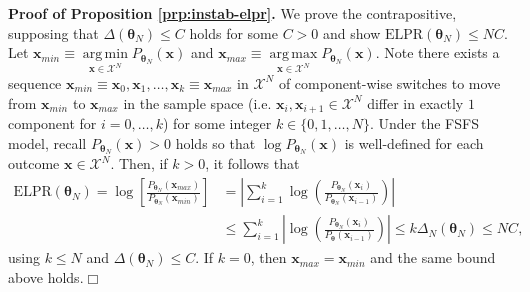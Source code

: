 \documentclass[12pt]{article}
\theoremstyle{definition}
\DeclareMathOperator*{\argmin}{arg\,min}
\DeclareMathOperator*{\argmax}{arg\,max}
\begin{document}
\textbf{Proof of Proposition \ref{prp:instab-elpr}.} We prove the
contrapositive, supposing that \(\Delta(\boldsymbol \theta_N) \le C\)
holds for some \(C > 0\) and show
\(\text{ELPR}(\boldsymbol \theta_N) \leq NC\). Let
\(\boldsymbol x_{min} \equiv \argmin\limits_{\boldsymbol x \in \mathcal{X}^N}P_{\boldsymbol \theta_N}(\boldsymbol x)\)
and
\(\boldsymbol x_{max} \equiv \argmax\limits_{\boldsymbol x \in \mathcal{X}^N}P_{\boldsymbol \theta_N}(\boldsymbol x)\).
Note there exists a sequence
\(\boldsymbol x_{min} \equiv \boldsymbol x_0, \boldsymbol x_1, \dots, \boldsymbol x_k \equiv \boldsymbol x_{max}\)
in \(\mathcal{X}^N\) of component-wise switches to move from
\(\boldsymbol x_{min}\) to \(\boldsymbol x_{max}\) in the sample space
(i.e. \(\boldsymbol x_i, \boldsymbol x_{i + 1} \in \mathcal{X}^N\)
differ in exactly \(1\) component for \(i = 0, \dots, k\)) for some
integer \(k \in \{0, 1, \dots, N\}\). Under the FSFS model, recall
\(P_{\boldsymbol \theta_N}(\boldsymbol x) > 0\) holds so that
\(\log P_{\boldsymbol \theta_N}(\boldsymbol x)\) is well-defined for
each outcome \(\boldsymbol x \in \mathcal{X}^N\). Then, if \(k > 0\), it
follows that
\begin{align*}
\text{ELPR}(\boldsymbol \theta_N) = \log\left[\frac{P_{\boldsymbol \theta_N}(\boldsymbol x_{max})}{P_{\boldsymbol \theta_N}(\boldsymbol x_{min})}\right] &= \left|\sum\limits_{i = 1}^k\log\left(\frac{P_{\boldsymbol \theta_N}(\boldsymbol x_i)}{P_{\boldsymbol \theta_N}(\boldsymbol x_{i-1})}\right)\right| \\
&\le \sum\limits_{i = 1}^k\left|\log\left(\frac{P_{\boldsymbol \theta_N}(\boldsymbol x_i)}{P_{\boldsymbol \theta}(\boldsymbol x_{i-1})}\right)\right| \le k \Delta_N(\boldsymbol \theta_N) \le NC,
\end{align*}
using \(k \le N\) and \(\Delta(\boldsymbol \theta_N) \le C\). If
\(k = 0\), then \(\boldsymbol x_{max} = \boldsymbol x_{min}\) and the
same bound above holds.\hfill \(\Box\)
\end{document}
